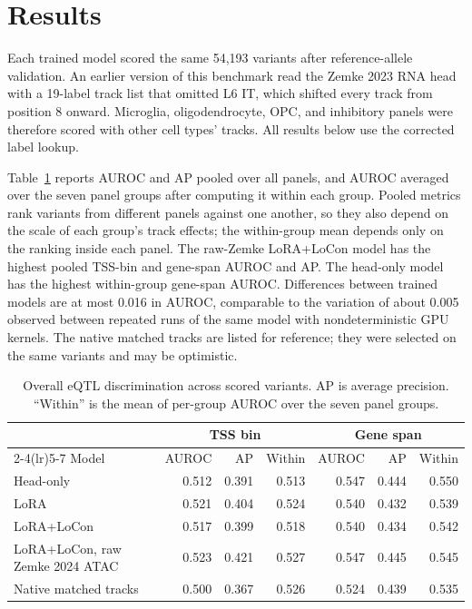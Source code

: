 \documentclass[11pt]{article}
\begin{document}
\section{Results}
Each trained model scored the same 54,193 variants after reference-allele
validation. An earlier version of this benchmark read the Zemke 2023 RNA head
with a 19-label track list that omitted L6 IT, which shifted every track from
position 8 onward. Microglia, oligodendrocyte, OPC, and inhibitory panels were
therefore scored with other cell types' tracks. All results below use the
corrected label lookup.

Table~\ref{tab:overall_performance} reports AUROC and AP pooled over all
panels, and AUROC averaged over the seven panel groups after computing it
within each group. Pooled metrics rank variants from different panels against
one another, so they also depend on the scale of each group's track effects;
the within-group mean depends only on the ranking inside each panel. The
raw-Zemke LoRA+LoCon model has the highest pooled TSS-bin and gene-span AUROC
and AP. The head-only model has the highest within-group gene-span AUROC.
Differences between trained models are at most 0.016 in AUROC, comparable to
the variation of about 0.005 observed between repeated runs of the same model
with nondeterministic GPU kernels. The native matched tracks are listed for
reference; they were selected on the same variants and may be optimistic.

\begin{table}[ht]
\centering
\small
\caption{Overall eQTL discrimination across scored variants. AP is average
precision. ``Within'' is the mean of per-group AUROC over the seven panel
groups.}
\label{tab:overall_performance}
\begin{tabular}{@{}lrrrrrr@{}}
\toprule
 & \multicolumn{3}{c}{TSS bin} & \multicolumn{3}{c}{Gene span} \\
\cmidrule(lr){2-4}\cmidrule(lr){5-7}
Model & AUROC & AP & Within & AUROC & AP & Within \\
\midrule
Head-only & 0.512 & 0.391 & 0.513 & 0.547 & 0.444 & 0.550 \\
LoRA & 0.521 & 0.404 & 0.524 & 0.540 & 0.432 & 0.539 \\
LoRA+LoCon & 0.517 & 0.399 & 0.518 & 0.540 & 0.434 & 0.542 \\
LoRA+LoCon, raw Zemke 2024 ATAC & 0.523 & 0.421 & 0.527 & 0.547 & 0.445 & 0.545 \\
Native matched tracks & 0.500 & 0.367 & 0.526 & 0.524 & 0.439 & 0.535 \\
\bottomrule
\end{tabular}
\end{table}
\end{document}
